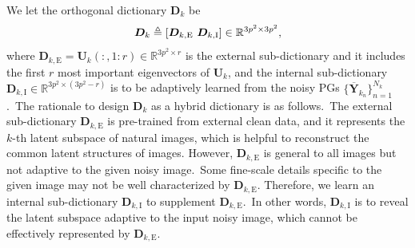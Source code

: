 We let the orthogonal dictionary $\bm{D}_{k}$ be 
\vspace{-2mm}
\begin{equation}
\vspace{-2mm}
\label{equ4}
\bm{D}_{k}\triangleq[\bm{D}_{k,\text{E}}\ \bm{D}_{k,\text{I}}]\in \mathbb{R}^{3p^2\times 3p^2},
\end{equation}
where $\bm{D}_{k,\text{E}}=\bm{U}_{k}(:,1:r)\in\mathbb{R}^{3p^2\times r}$ is the external sub-dictionary and it includes the first $r$ most important eigenvectors of $\bm{U}_{k}$, and the internal sub-dictionary $\bm{D}_{k,\text{I}}\in\mathbb{R}^{3p^2\times (3p^2-r)}$ is to be adaptively learned from the noisy PGs $\{\bm{\overline{Y}}_{k_{n}}\}_{n=1}^{N_{k}}$.\ The rationale to design $\bm{D}_{k}$ as a hybrid dictionary is as follows.\ The external sub-dictionary $\bm{D}_{k,\text{E}}$ is pre-trained from external clean data, and it represents the $k$-th latent subspace of natural images, which is helpful to reconstruct the common latent structures of images. However, $\bm{D}_{k,\text{E}}$ is general to all images but not adaptive to the given noisy image.\ Some fine-scale details specific to the given image may not be well characterized by $\bm{D}_{k,\text{E}}$. Therefore, we learn an internal sub-dictionary $\bm{D}_{k,\text{I}}$ to supplement $\bm{D}_{k,\text{E}}$.\ In other words, $\bm{D}_{k,\text{I}}$ is to reveal the latent subspace adaptive to the input noisy image, which cannot be effectively represented by $\bm{D}_{k,\text{E}}$. 

